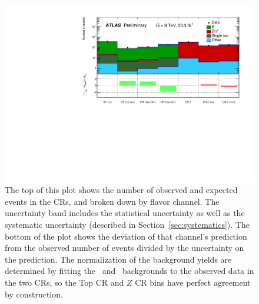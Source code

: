 \begin{figure}[ht]
\centering
\includegraphics[width=\textwidth]{figs/blstop/histpull_CR_detailed.pdf}
\caption{The top of this plot shows the number of observed and expected
  events in the CRs, and broken down by flavor channel.
  The uncertainty band includes the statistical uncertainty as well as the
  systematic uncertainty (described in Section~\ref{sec:systematics}). The
  bottom of the plot shows the deviation of that channel's prediction
  from the observed number of events divided by the uncertainty on the
  prediction. The normalization of the background yields are determined
  by fitting the \TTBAR\ and \ZGAMMAJETS\ backgrounds to the observed
  data in the two CRs, so the Top CR and $Z$ CR bins have perfect agreement by
  construction.
}
\label{fig:pull_dist_cr}
\end{figure}

